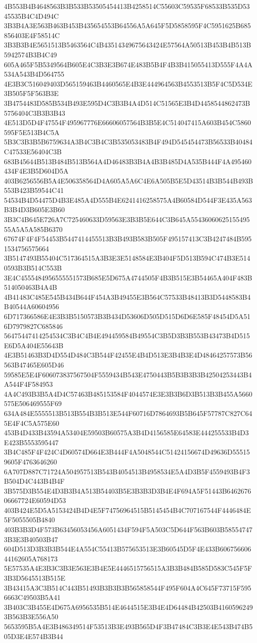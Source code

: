 {{{{{{{{{{{{{{{{{{{{{4B553B4B4648563B3B533B53505454413B4258514C55603C59535F68533B535D5345535B4C4D494C
3B3B4A3E563B463B453B435654553B64556A5A645F5D5858595F4C5951625B685856403E4F58514C
3B3B3B4E5651513B5463564C4B43514349675643424E57564A50513B453B4B513B5942574B3B4C49
605A465F5B5349564B605E4C3B3E3B674E483B5B4F4B3B415055413D555F4A4A534A543B4D564755
4E3B3C516049403D565159463B4460565E4B3E444964563B4553513B5F4C5D534E3B505F5F563B3E
3B4754483D585B534B493E595D4C3B3B4A4D514C51565E3B4D4458544862473B5756404C3B3B3B43
4E513D5D4F47554F495967776E66606057564B3B5E4C514047415A603B454C5860595F5E513B4C5A
5B3C3B3B5B6759634A3B4C3B4C3B535053483B4F494D545454473B56533B40484C47533E56404C3B
683B45644B513B484B513B564A4D46483B3B4A4B3B485D4A535B444F4A495460434F4E3B5D604D5A
403B6256556B5A4E506358564D4A605A5A6C4E6A505B5E5D43514B3B544B493B553B423B59544C41
54534B4D54475D4B3E485A4D555B4E6241416258575A4B60584D544F3E435A563B3B4D3B605E3B60
3B3C4B645E726A7C725460633D59563E3B3B5E644C3B645A5543606062515549555A5A5A585B6370
67674F4F4F54453B5447414455513B3B493B583B505F495157413C3B4247484B5951534756575664
3B5147493B55404C517364515A3B3E3E5148584E3B404F5D513B594C474B3E5140593B3B514C553B
3E4C4555484956555551573B685E5D675A4744505F4B3B515E3B54465A404F483B514050463B4A4B
4B41483C485E545B434B644F454A3B49455E3B564C57533B48413B3D5448583B4B40544A60604956
6D717366586E4E3B3B5150573B3B434D53606D505D515D6D6E585F48454D5A516D7979827C685846
56475447414254534C3B4C4B4E494459584B49554C3B5D3B3B553B43473B4D515E6D5A404E55643B
4E3B51463B3D4D554D484C3B544F42455E4B4D513E3B4B3E4D48464257573B56563B47465E605D46
59585E5E4F606073837567504F5559434B543E4750443B5B3B3B3B42504253443B4A544F4F584953
4A4C493B3B5A4D4C57463B485153584F4044574E3E3B3B6D3B513B3B455A5660575E506469555F69
634A484E5555513B513B554B3B513E544F60716D7864693B5B645F57787C827C645E4F4C5A575E60
453B4D433B43594A53404E59503B60575A3B4D4156585E64583E444255533B4D3E423B5553595447
3B4C485F4F424C4D60574D664E3B444F4A5048544C51424156674D49636D555159605F4763646260
6A707D887C71724A504957513B543B4054513B4958534E5A4D3B5F4559493B4F3B504D4C443B4B4F
3B575D3B554E4D3B3B4A513B54403B5E3B3B3D3B4E4F694A5F51443B646267606667724E60594D53
403B424E5D5A5153424B4D4E5F74756964515B5145454B4C707167544F4446484E5F5055505B4840
403B3B3D4F573B63456053456A6051434F594F5A503C5D644F563B603B585547473B3E3B40503B47
604D513D3B3B3B544E4A554C55413B575653513E3B60545D5F4E433B60675660644162605A768173
5E57535A4E3B3C3B3E563E3B4E5E4446515756515A3B3B484B585D583C545F5F3B3D5645513B515E
3B43415A3C3B514C443B51493B3B3B3B565858544F495F604A4C645F73715F5956663C49503B5A41
3B403C3B455E4D675A6956535B514E4644515E3B4E4D64484B42503B41605962493B563B3E556A50
5653595B5A4E3B486349514F53513B3E493B565D4F3B47484C3B3E4E543B474B505D3E4E574B3B44
}}}}}}}}}}}}}}}}}}}}}
